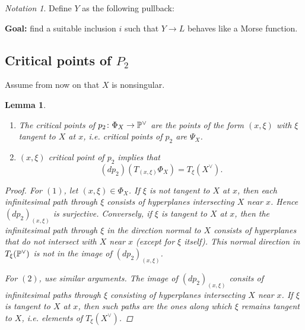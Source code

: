 \documentclass[A4paper, british]{amsart}
\theoremstyle{darkgreentheorem}
\newtheorem{lm}[thm]{Lemma}
\theoremstyle{darkbluedefinition}
\theoremstyle{darkredexample}
\theoremstyle{remark}
\newtheorem{nota}[thm]{Notation}
\newcommand{\1}{\mathbbm{1}}
\newcommand{\dual}{^{\vee}}
\begin{document}
\begin{nota}
    Define $Y$ as the following pullback:
    \begin{center}
    \end{center}
\end{nota}

\textbf{Goal:} find a suitable inclusion $i$ such that $Y\to L$ behaves like a Morse function.

\subsection{Critical points of $P_{2}$}

Assume from now on that $X$ is nonsingular.

\begin{lm}
    \begin{enumerate}
	\item The critical points of $p_{2}\colon \Phi_{X}\to \P\dual$ are the points of the form $(x,\xi)$ with $\xi$ tangent to $X$ at $x$, i.e. critical points of $p_{2}$ are $\Psi_{X}$.
	\item $(x,\xi)$ critical point of $p_{2}$ implies that
	    \[ (dp_{2})(T_{(x,\xi)}\Phi_{X})=T_{\xi}(X\dual). \]
    \end{enumerate}
    \begin{proof}
	For $(1)$, let $(x,\xi)\in \Phi_{X}$.
	If $\xi$ is not tangent to $X$ at $x$, then each infinitesimal path through $\xi$ consists of hyperplanes intersecting $X$ near $x$.
	Hence $(dp_{2})_{(x,\xi)}$ is surjective.
	Conversely, if $\xi$ is tangent to $X$ at $x$, then the infinitesimal path through $\xi$ in the direction normal to $X$ consists of hyperplanes that do not intersect with $X$ near $x$ (except for $\xi$ itself).
	This normal direction in $T_{\xi}(\P\dual)$ is not in the image of $(dp_{2})_{(x,\xi)}$.

	For $(2)$, use similar arguments.
	The image of $(dp_{2})_{(x,\xi)}$ consits of infinitesimal paths through $\xi$ consisting of hyperplanes intersecting $X$ near $x$.
	If $\xi$ is tangent to $X$ at $x$, then such paths are the ones along which $\xi$ remains tangent to $X$, i.e. elements of $T_{\xi}(X\dual)$.
    \end{proof}
\end{lm}
\end{document}
